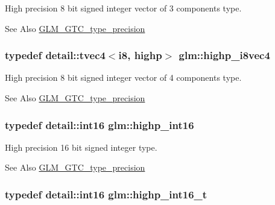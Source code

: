 High precision 8 bit signed integer vector of 3 components type. \begin{DoxySeeAlso}{See Also}
\hyperlink{group__gtc__type__precision}{G\-L\-M\-\_\-\-G\-T\-C\-\_\-type\-\_\-precision} 
\end{DoxySeeAlso}
\hypertarget{group__gtc__type__precision_ga283b2f580a4bd7207d27418ef4a1068b}{
\subsubsection[{highp\-\_\-i8vec4}]{\setlength{\rightskip}{0pt plus 5cm}typedef detail\-::tvec4$<$i8, highp$>$ {\bf glm\-::highp\-\_\-i8vec4}}}\label{group__gtc__type__precision_ga283b2f580a4bd7207d27418ef4a1068b}
High precision 8 bit signed integer vector of 4 components type. \begin{DoxySeeAlso}{See Also}
\hyperlink{group__gtc__type__precision}{G\-L\-M\-\_\-\-G\-T\-C\-\_\-type\-\_\-precision} 
\end{DoxySeeAlso}
\hypertarget{group__gtc__type__precision_gaf0430ed80e88c0d1dfbe47f359659c81}{
\subsubsection[{highp\-\_\-int16}]{\setlength{\rightskip}{0pt plus 5cm}typedef detail\-::int16 {\bf glm\-::highp\-\_\-int16}}}\label{group__gtc__type__precision_gaf0430ed80e88c0d1dfbe47f359659c81}
High precision 16 bit signed integer type. \begin{DoxySeeAlso}{See Also}
\hyperlink{group__gtc__type__precision}{G\-L\-M\-\_\-\-G\-T\-C\-\_\-type\-\_\-precision} 
\end{DoxySeeAlso}
\hypertarget{group__gtc__type__precision_ga07d318d61472e75238e53b9642227672}{
\subsubsection[{highp\-\_\-int16\-\_\-t}]{\setlength{\rightskip}{0pt plus 5cm}typedef detail\-::int16 {\bf glm\-::highp\-\_\-int16\-\_\-t}}}\label{group__gtc__type__precision_ga07d318d61472e75238e53b9642227672}
